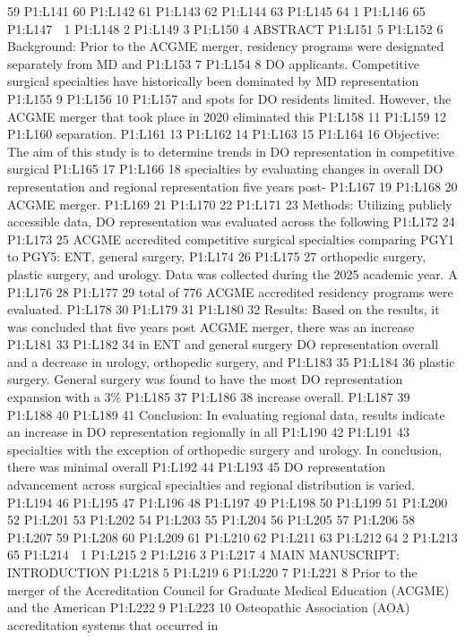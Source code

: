59 P1:L141 60 P1:L142 61 P1:L143 62 P1:L144 63 P1:L145 64 1 P1:L146 65
P1:L147  1 P1:L148 2 P1:L149 3 P1:L150 4 ABSTRACT P1:L151 5 P1:L152 6
Background: Prior to the ACGME merger, residency programs were
designated separately from MD and P1:L153 7 P1:L154 8 DO applicants.
Competitive surgical specialties have historically been dominated by MD
representation P1:L155 9 P1:L156 10 P1:L157 and spots for DO residents
limited. However, the ACGME merger that took place in 2020 eliminated
this P1:L158 11 P1:L159 12 P1:L160 separation. P1:L161 13 P1:L162 14
P1:L163 15 P1:L164 16 Objective: The aim of this study is to determine
trends in DO representation in competitive surgical P1:L165 17 P1:L166
18 specialties by evaluating changes in overall DO representation and
regional representation five years post- P1:L167 19 P1:L168 20 ACGME
merger. P1:L169 21 P1:L170 22 P1:L171 23 Methods: Utilizing publicly
accessible data, DO representation was evaluated across the following
P1:L172 24 P1:L173 25 ACGME accredited competitive surgical specialties
comparing PGY1 to PGY5: ENT, general surgery, P1:L174 26 P1:L175 27
orthopedic surgery, plastic surgery, and urology. Data was collected
during the 2025 academic year. A P1:L176 28 P1:L177 29 total of 776
ACGME accredited residency programs were evaluated. P1:L178 30 P1:L179
31 P1:L180 32 Results: Based on the results, it was concluded that five
years post ACGME merger, there was an increase P1:L181 33 P1:L182 34 in
ENT and general surgery DO representation overall and a decrease in
urology, orthopedic surgery, and P1:L183 35 P1:L184 36 plastic surgery.
General surgery was found to have the most DO representation expansion
with a 3\% P1:L185 37 P1:L186 38 increase overall. P1:L187 39 P1:L188 40
P1:L189 41 Conclusion: In evaluating regional data, results indicate an
increase in DO representation regionally in all P1:L190 42 P1:L191 43
specialties with the exception of orthopedic surgery and urology. In
conclusion, there was minimal overall P1:L192 44 P1:L193 45 DO
representation advancement across surgical specialties and regional
distribution is varied. P1:L194 46 P1:L195 47 P1:L196 48 P1:L197 49
P1:L198 50 P1:L199 51 P1:L200 52 P1:L201 53 P1:L202 54 P1:L203 55
P1:L204 56 P1:L205 57 P1:L206 58 P1:L207 59 P1:L208 60 P1:L209 61
P1:L210 62 P1:L211 63 P1:L212 64 2 P1:L213 65 P1:L214  1 P1:L215 2
P1:L216 3 P1:L217 4 MAIN MANUSCRIPT: INTRODUCTION P1:L218 5 P1:L219 6
P1:L220 7 P1:L221 8 Prior to the merger of the Accreditation Council for
Graduate Medical Education (ACGME) and the American P1:L222 9 P1:L223 10
Osteopathic Association (AOA) accreditation systems that occurred in

